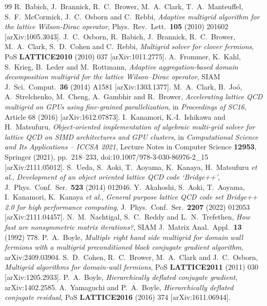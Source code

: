 \documentclass[11pt,a4paper]{article}
\newcounter{alg}
\numberwithin{equation}{section}
\begin{document}
\begin{thebibliography}{99}
 R.~Babich, J.~Brannick, R.~C.~Brower, M.~A.~Clark, T.~A.~Manteuffel, S.~F.~McCormick, J.~C.~Osborn and C.~Rebbi, \emph{Adaptive multigrid algorithm for the lattice Wilson-Dirac operator},
Phys.\ Rev.\ Lett.\ \textbf{105} (2010) 201602 [arXiv:1005.3043].
 J.~C.~Osborn, R.~Babich, J.~Brannick, R.~C.~Brower, M.~A.~Clark, S.~D.~Cohen and C.~Rebbi, \emph{Multigrid solver for clover fermions},
PoS \textbf{LATTICE2010} (2010) 037 [arXiv:1011.2775].
 A.~Frommer, K.~Kahl, S.~Krieg, B.~Leder and M.~Rottmann, \emph{Adaptive aggregation-based domain decomposition multigrid for the lattice Wilson--Dirac operator},
SIAM J.\ Sci.\ Comput.\ \textbf{36} (2014) A1581 [arXiv:1303.1377].
 M.~A.~Clark, B.~Jo\'o, A.~Strelchenko, M.~Cheng, A.~Gambhir and R.~Brower, \emph{Accelerating lattice QCD multigrid on GPUs using fine-grained parallelization}, in \emph{Proceedings of SC16}, Article 68 (2016) [arXiv:1612.07873].
 I.~Kanamori, K.-I.~Ishikawa and H.~Matsufuru, \emph{Object-oriented implementation of algebraic multi-grid solver for lattice QCD on SIMD architectures and GPU clusters}, in \emph{Computational Science and Its Applications -- ICCSA 2021}, Lecture Notes in Computer Science \textbf{12953}, Springer (2021), pp.~218--233, doi:10.1007/978-3-030-86976-2\_15 [arXiv:2111.05012].
 S.~Ueda, S.~Aoki, T.~Aoyama, K.~Kanaya, H.~Matsufuru \emph{et al.}, \emph{Development of an object oriented lattice QCD code `Bridge++'},
J.\ Phys.\ Conf.\ Ser.\ \textbf{523} (2014) 012046.
 Y.~Akahoshi, S.~Aoki, T.~Aoyama, I.~Kanamori, K.~Kanaya \emph{et al.}, \emph{General purpose lattice QCD code set Bridge++ 2.0 for high performance computing},
J.\ Phys.\ Conf.\ Ser.\ \textbf{2207} (2022) 012053 [arXiv:2111.04457].
 N.~M.~Nachtigal, S.~C.~Reddy and L.~N.~Trefethen, \emph{How fast are nonsymmetric matrix iterations?},
SIAM J.\ Matrix Anal.\ Appl.\ \textbf{13} (1992) 778.
 P.~A.~Boyle, \emph{Multiple right hand side multigrid for domain wall fermions with a multigrid preconditioned block conjugate gradient algorithm}, arXiv:2409.03904.
 S.~D.~Cohen, R.~C.~Brower, M.~A.~Clark and J.~C.~Osborn, \emph{Multigrid algorithms for domain-wall fermions},
PoS \textbf{LATTICE2011} (2011) 030 [arXiv:1205.2933].
 P.~A.~Boyle, \emph{Hierarchically deflated conjugate gradient}, arXiv:1402.2585.
 A.~Yamaguchi and P.~A.~Boyle, \emph{Hierarchically deflated conjugate residual},
PoS \textbf{LATTICE2016} (2016) 374 [arXiv:1611.06944].

\end{thebibliography}
\end{document}
